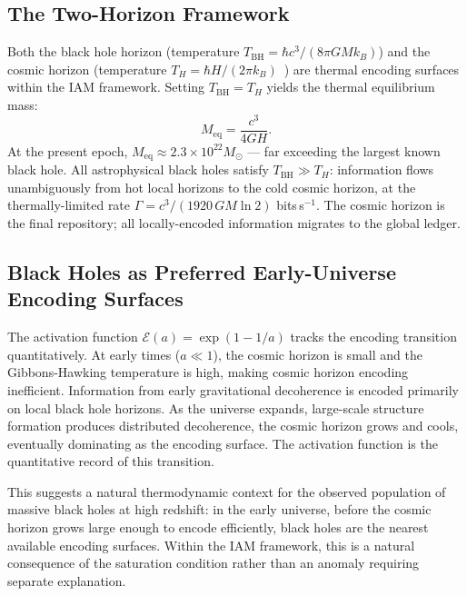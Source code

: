 \documentclass[12pt,a4paper]{article}
\begin{document}
\subsection{The Two-Horizon Framework}

Both the black hole horizon (temperature $T_\mathrm{BH} = \hbar c^3
/(8\pi GMk_B)$) and the cosmic horizon (temperature $T_H = \hbar H/
(2\pi k_B)$~\citep{Gibbons1977}) are thermal encoding surfaces within
the IAM framework. Setting $T_\mathrm{BH} = T_H$ yields the thermal
equilibrium mass:
\begin{equation}
M_\mathrm{eq} = \frac{c^3}{4GH}.
\label{eq:Meq}
\end{equation}
At the present epoch, $M_\mathrm{eq} \approx 2.3 \times 10^{22}
M_\odot$ --- far exceeding the largest known black hole. All
astrophysical black holes satisfy $T_\mathrm{BH} \gg T_H$: information
flows unambiguously from hot local horizons to the cold cosmic
horizon, at the thermally-limited rate $\Gamma = c^3/(1920\,GM\ln 2)$
bits\,s$^{-1}$. The cosmic horizon is the final repository; all
locally-encoded information migrates to the global ledger.

\subsection{Black Holes as Preferred Early-Universe Encoding Surfaces}

The activation function $\mathcal{E}(a) = \exp(1-1/a)$ tracks the
encoding transition quantitatively. At early times ($a \ll 1$), the
cosmic horizon is small and the Gibbons-Hawking temperature is high,
making cosmic horizon encoding inefficient. Information from early
gravitational decoherence is encoded primarily on local black hole
horizons. As the universe expands, large-scale structure formation
produces distributed decoherence, the cosmic horizon grows and cools,
eventually dominating as the encoding surface. The activation function
is the quantitative record of this transition.

This suggests a natural thermodynamic context for the observed
population of massive black holes at high redshift: in the early
universe, before the cosmic horizon grows large enough to encode
efficiently, black holes are the nearest available encoding surfaces.
Within the IAM framework, this is a natural consequence of the
saturation condition rather than an anomaly requiring separate
explanation.

\end{document}
